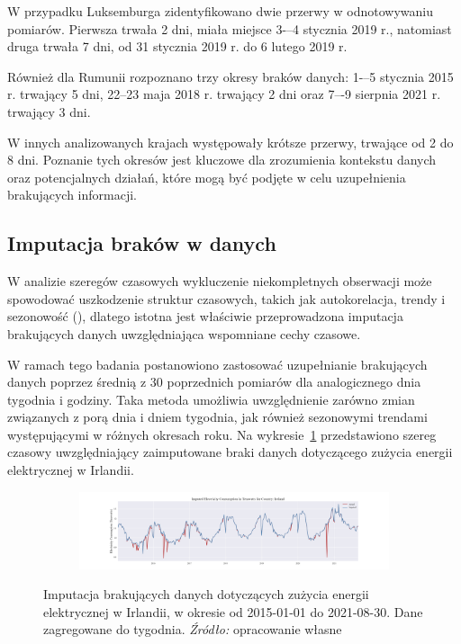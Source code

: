 \documentclass[polish, twoside, 12pt, a4paper]{article}
\theoremstyle{definition}
\theoremstyle{plain}
\theoremstyle{remark}
\begin{document}
W przypadku Luksemburga zidentyfikowano dwie przerwy w odnotowywaniu pomiarów. Pierwsza trwała 2 dni, miała miejsce 3-–4 stycznia 2019 r., natomiast druga trwała 7 dni, od 31 stycznia 2019 r. do 6 lutego 2019 r.

Również dla Rumunii rozpoznano trzy okresy braków danych: 1-–5 stycznia 2015 r. trwający 5 dni, 22--23 maja 2018 r. trwający 2 dni oraz 7–-9 sierpnia 2021 r. trwający 3 dni.

W innych analizowanych krajach występowały krótsze przerwy, trwające od 2 do 8 dni. Poznanie tych okresów jest kluczowe dla zrozumienia kontekstu danych oraz potencjalnych działań, które mogą być podjęte w celu uzupełnienia brakujących informacji.

\subsection{Imputacja braków w danych}

W analizie szeregów czasowych wykluczenie niekompletnych obserwacji może spowodować uszkodzenie struktur czasowych, takich jak autokorelacja, trendy i sezonowość (\cite{box1994}), dlatego istotna jest właściwie przeprowadzona imputacja brakujących danych uwzględniająca wspomniane cechy czasowe. 

W ramach tego badania postanowiono zastosować uzupełnianie brakujących danych poprzez średnią z 30 poprzednich pomiarów dla analogicznego dnia tygodnia i godziny. Taka metoda umożliwia uwzględnienie zarówno zmian związanych z porą dnia i dniem tygodnia, jak również sezonowymi trendami występującymi w różnych okresach roku. Na wykresie~\ref{fig:x12} przedstawiono szereg czasowy uwzględniający zaimputowane braki danych dotyczącego zużycia energii elektrycznej w Irlandii.

\begin{figure}[hbt]
  \centering

  \begin{subfigure}[t]{0.95\textwidth}
    \includegraphics[width=\textwidth]{./out_figures/imputed_electricity_consumption_Ireland.png}
  \end{subfigure}

  \captionsetup{margin=10pt,font=small,labelfont=bf,width=.8\textwidth}

  \caption[Imputacja brakujących danych dotyczących zużycia energii elektrycznej w Irlandii, w okresie od 2015-01-01 do 2021-08-30. Dane zagregowane do tygodnia.]{Imputacja brakujących danych dotyczących zużycia energii elektrycznej w Irlandii, w okresie od 2015-01-01 do 2021-08-30. Dane zagregowane do tygodnia. \textit{Źródło:} opracowanie własne}\label{fig:x12}
\end{figure}
\end{document}
